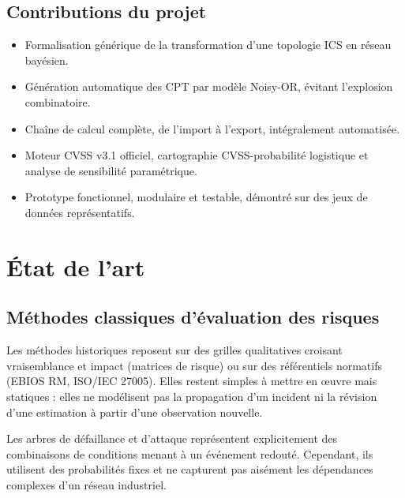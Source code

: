 \documentclass[12pt,a4paper]{article}
\newcommand{\forcereset}[1]{}
\begin{document}
\subsection{Contributions du projet}
\forcereset{5}

\begin{contributionbox}[Contributions]
\begin{itemize}[leftmargin=1.2cm, itemsep=0.2\baselineskip, topsep=2pt]
    \item Formalisation générique de la transformation d'une topologie ICS en réseau bayésien.
    \item Génération automatique des CPT par modèle Noisy-OR, évitant l'explosion combinatoire.
    \item Chaîne de calcul complète, de l'import à l'export, intégralement automatisée.
    \item Moteur CVSS v3.1 officiel, cartographie CVSS-probabilité logistique et analyse de sensibilité paramétrique.
    \item Prototype fonctionnel, modulaire et testable, démontré sur des jeux de données représentatifs.
\end{itemize}
\end{contributionbox}

\section{État de l'art}
\forcereset{6}

\subsection{Méthodes classiques d'évaluation des risques}
\forcereset{4}

Les méthodes historiques reposent sur des grilles qualitatives croisant vraisemblance et impact (matrices de risque) ou sur des référentiels normatifs (EBIOS RM, ISO/IEC 27005). Elles restent simples à mettre en œuvre mais statiques : elles ne modélisent pas la propagation d'un incident ni la révision d'une estimation à partir d'une observation nouvelle.

Les arbres de défaillance et d'attaque représentent explicitement des combinaisons de conditions menant à un événement redouté. Cependant, ils utilisent des probabilités fixes et ne capturent pas aisément les dépendances complexes d'un réseau industriel.
\end{document}
